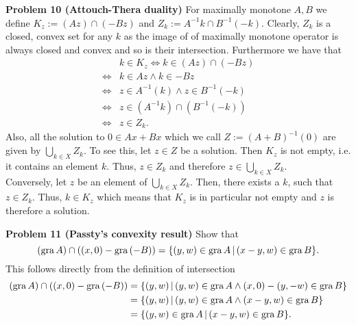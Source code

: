 \documentclass{scrartcl}
\theoremstyle{plain}
\theoremstyle{remark}
\newcommand{\gr}{\textup{gra}\,}
\begin{document}
\textbf{Problem 10 (Attouch-Thera duality)} For maximally monotone $A,B$ we define $K_{z} := (Az) \cap (-Bz)$ and $Z_{k} := A^{-1}k \cap B^{-1}(-k)$. Clearly, $Z_{k}$ is a closed, convex set for any $k$ as the image of of maximally monotone operator is always closed and convex and so is their intersection.
Furthermore we have that
\begin{equation}
  \begin{aligned}
    & k \in K_{z} \Leftrightarrow k \in (Az) \cap (-Bz) \\
    \Leftrightarrow& k \in Az \wedge k \in -Bz \\
    \Leftrightarrow& z \in A^{-1}(k) \wedge z \in B^{-1}(-k) \\
    \Leftrightarrow& z \in (A^{-1}k) \cap (B^{-1}(-k)) \\
    \Leftrightarrow& z \in Z_{k}.
  \end{aligned}
\end{equation}
Also, all the solution to $0 \in Ax + Bx$ which we call $Z:= {(A + B)}^{-1}(0)$ are given by $\bigcup_{k \in X} Z_{k}$. To see this, let $z \in Z$ be a solution. Then $K_{z}$ is not empty, i.e. it contains an element $k$. 
Thus, $z \in Z_{k}$ and therefore $z \in \bigcup_{k \in X} Z_{k}$.\\
Conversely, let $z$ be an element of $\bigcup_{k \in X} Z_{k}$. Then, there exists a $k$, such that $z \in Z_{k}$. Thus, $k \in K_{z}$ which means that $K_{z}$ is in particular not empty and $z$ is therefore a solution.

\textbf{Problem 11 (Passty's convexity result)} Show that
\begin{equation}
  (\gr A) \cap ((x,0) - \gr (-B)) = \{(y,w) \in \gr A \,| \,(x-y,w) \in \gr B\}.
\end{equation}
This follows directly from the definition of intersection
\begin{equation}
  \begin{aligned}
    (\gr A) \cap ((x,0) - \gr (-B)) &= \{(y,w) \,| \,(y,w) \in \gr A \wedge (x,0) - (y,-w) \in \gr B\} \\
    &= \{(y,w) \,| \,(y,w) \in \gr A \wedge (x-y,w) \in \gr B\} \\
    &= \{(y,w) \in \gr A \,| \,(x-y,w) \in \gr B\}.
  \end{aligned}
\end{equation}
\end{document}
